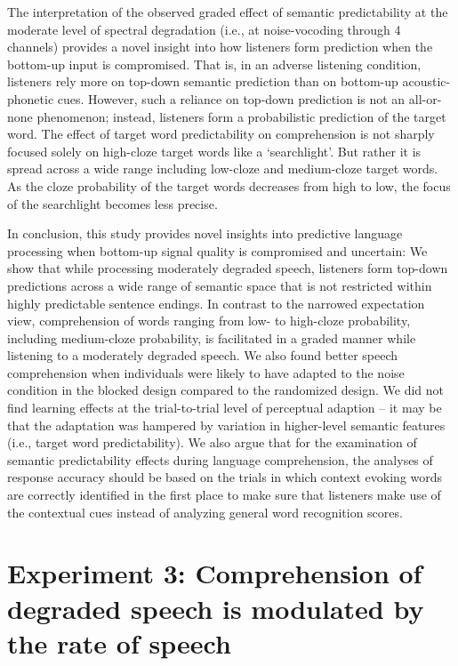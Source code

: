 \documentclass[a4paper, nobind]{templates/ociamthesis}
\begin{document}
The interpretation of the observed graded effect of semantic predictability at the moderate level of spectral degradation (i.e., at noise-vocoding through 4 channels) provides a novel insight into how listeners form prediction when the bottom-up input is compromised.
That is, in an adverse listening condition, listeners rely more on top-down semantic prediction than on bottom-up acoustic-phonetic cues.
However, such a reliance on top-down prediction is not an all-or-none phenomenon; instead, listeners form a probabilistic prediction of the target word.
The effect of target word predictability on comprehension is not sharply focused solely on high-cloze target words like a `searchlight'.
But rather it is spread across a wide range including low-cloze and medium-cloze target words. As the cloze probability of the target words decreases from high to low, the focus of the searchlight becomes less precise.

In conclusion, this study provides novel insights into predictive language processing when bottom-up signal quality is compromised and uncertain:
We show that while processing moderately degraded speech, listeners form top-down predictions across a wide range of semantic space that is not restricted within highly predictable sentence endings.
In contrast to the narrowed expectation view, comprehension of words ranging from low- to high-cloze probability, including medium-cloze probability, is facilitated in a graded manner while listening to a moderately degraded speech.
We also found better speech comprehension when individuals were likely to have adapted to the noise condition in the blocked design compared to the randomized design.
We did not find learning effects at the trial-to-trial level of perceptual adaption -- it may be that the adaptation was hampered by variation in higher-level semantic features (i.e., target word predictability).
We also argue that for the examination of semantic predictability effects during language comprehension, the analyses of response accuracy should be based on the trials in which context evoking words are correctly identified in the first place to make sure that listeners make use of the contextual cues instead of analyzing general word recognition scores.

\hypertarget{experiment-3-comprehension-of-degraded-speech-is-modulated-by-the-rate-of-speech}{%
\chapter{Experiment 3: Comprehension of degraded speech is modulated by the rate of speech}\label{experiment-3-comprehension-of-degraded-speech-is-modulated-by-the-rate-of-speech}}
\end{document}
